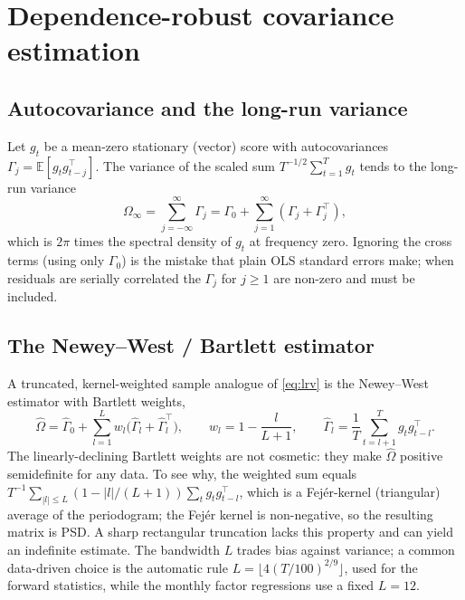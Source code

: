\section{Dependence-robust covariance estimation}\label{prelim-hac}

\subsection{Autocovariance and the long-run variance}

Let $g_t$ be a mean-zero stationary (vector) score with autocovariances
$\Gamma_j=\mathbb{E}[g_t g_{t-j}^{\top}]$. The variance of the scaled sum
$T^{-1/2}\sum_{t=1}^{T}g_t$ tends to the long-run variance
\begin{equation}\label{eq:lrv}
\Omega_\infty=\sum_{j=-\infty}^{\infty}\Gamma_j
=\Gamma_0+\sum_{j=1}^{\infty}(\Gamma_j+\Gamma_j^{\top}),
\end{equation}
which is $2\pi$ times the spectral density of $g_t$ at frequency zero.
Ignoring the cross terms (using only $\Gamma_0$) is the mistake that
plain OLS standard errors make; when residuals are serially correlated the
$\Gamma_j$ for $j\ge 1$ are non-zero and must be included.

\subsection{The Newey--West / Bartlett estimator}

A truncated, kernel-weighted sample analogue of \eqref{eq:lrv} is the
Newey--West estimator with Bartlett weights,
\begin{equation}\label{eq:nw}
\hat\Omega=\hat\Gamma_0+\sum_{l=1}^{L}w_l\bigl(\hat\Gamma_l+\hat\Gamma_l^{\top}\bigr),
\qquad w_l=1-\frac{l}{L+1},\qquad
\hat\Gamma_l=\frac1T\sum_{t=l+1}^{T}g_t g_{t-l}^{\top}.
\end{equation}
The linearly-declining Bartlett weights are not cosmetic: they make
$\hat\Omega$ positive semidefinite for any data. To see why, the weighted
sum equals $T^{-1}\sum_{|l|\le L}(1-|l|/(L+1))\sum_t g_t g_{t-l}^{\top}$,
which is a Fej\'er-kernel (triangular) average of the periodogram; the
Fej\'er kernel is non-negative, so the resulting matrix is PSD. A sharp
rectangular truncation lacks this property and can yield an indefinite
estimate. The bandwidth $L$ trades bias against variance; a common
data-driven choice is the automatic rule
$L=\lfloor 4(T/100)^{2/9}\rfloor$, used for the forward statistics, while
the monthly factor regressions use a fixed $L=12$.

